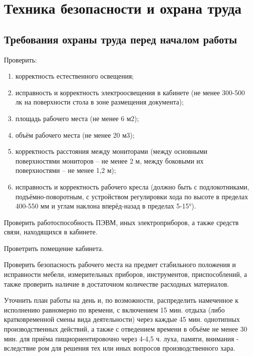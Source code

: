\section{Техника безопасности и охрана труда}

\vspace{-0.9cm}

\tocless\subsection{Требования охраны труда перед началом работы}


Проверить:
    \begin{enumerate}
        \item корректность естественного освещения;
        \item исправность и корректность электроосвещения в кабинете (не менее 300-500 лк на поверхности стола в зоне размещения документа);
        \item площадь рабочего места (не менее 6 м2);
        \item объём рабочего места (не менее 20 м3);
        \item корректность расстояния между мониторами (между основными поверхностями мониторов – не менее 2 м, между боковыми их поверхностями – не менее 1,2 м);
        \item исправность и корректность рабочего кресла (должно быть с подлокотниками, подъёмно-поворотным, с устройством регулировки хода по высоте в пределах 400-550 мм и углам наклона вперёд-назад в пределах 5-15°).
    \end{enumerate}
Проверить работоспособность ПЭВМ, иных электроприборов, а также средств связи, находящихся в кабинете.

Проветрить помещение кабинета.

Проверить безопасность рабочего места на предмет стабильного положения и исправности мебели, измерительных приборов, инструментов, приспособлений, а также проверить наличие в достаточном количестве расходных материалов.

Уточнить план работы на день и, по возможности, распределить намеченное к исполнению равномерно по времени, с включением 15 мин. отдыха (либо кратковременной смены вида деятельности) через каждые 45 мин. однотипных производственных действий, а также с отведением времени в объёме не менее 30 мин. для приёма пищиориентировочно через 4-4,5 ч. луха, памяти, внимания - вследствие ром для решения тех или иных вопросов производственного хара.


